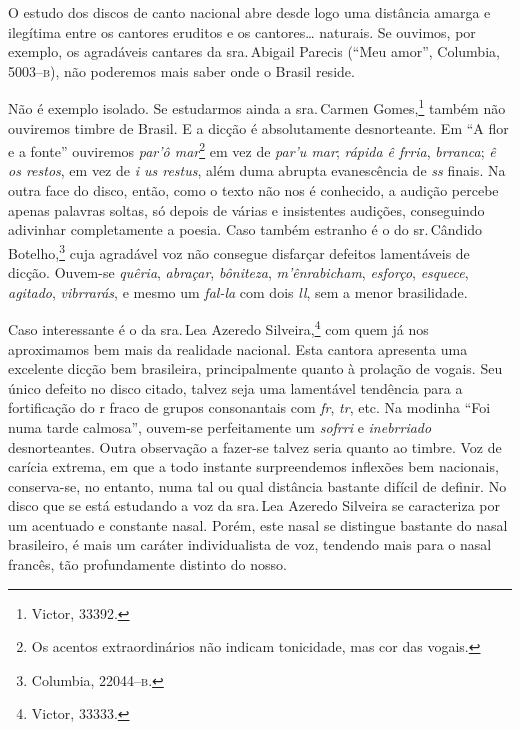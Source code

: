O estudo dos discos de canto nacional abre desde logo uma distância
amarga e ilegítima entre os cantores eruditos e os cantores\ldots{} naturais.
Se ouvimos, por exemplo, os agradáveis cantares da sra.\,Abigail Parecis
(``Meu amor'', Columbia, 5003--\textsc{b}), não poderemos mais saber onde o Brasil
reside.

Não é exemplo isolado. Se estudarmos ainda a sra.\,Carmen Gomes,\footnote{Victor,
33392.} também não ouviremos timbre de Brasil. E a dicção é
absolutamente desnorteante. Em ``A flor e a fonte'' ouviremos \textit{par'ô
mar}\footnote{Os acentos extraordinários não indicam tonicidade, mas cor das vogais.} em vez de \textit{par'u mar}; \textit{rápida ê frria}, \textit{brranca}; \textit{ê
os restos}, em vez de \textit{i us restus}, além duma abrupta evanescência
de \textit{ss} finais. Na outra face do disco, então, como o texto não nos é
conhecido, a audição percebe apenas palavras soltas, só depois de várias
e insistentes audições, conseguindo adivinhar completamente a poesia.
Caso também estranho é o do sr.\,Cândido Botelho,\footnote{Columbia, 22044--\textsc{b}.}
cuja agradável voz não consegue disfarçar defeitos lamentáveis de
dicção. Ouvem-se \textit{quêria}, \textit{abraçar}, \textit{bôniteza},
\textit{m'ênrabicham}, \textit{esforço}, \textit{esquece}, \textit{agitado}, \textit{vibrrarás},
e mesmo um \textit{fal-la} com dois \textit{ll}, sem a menor brasilidade.

Caso interessante é o da sra.\,Lea Azeredo Silveira,\footnote{Victor, 33333.} com
quem já nos aproximamos bem mais da realidade nacional. Esta cantora
apresenta uma excelente dicção bem brasileira, principalmente quanto à
prolação de vogais. Seu único defeito no disco citado, talvez seja uma
lamentável tendência para a fortificação do r fraco de grupos
consonantais com \textit{fr}, \textit{tr}, etc. Na modinha ``Foi numa tarde calmosa'',
ouvem-se perfeitamente um \textit{sofrri} e \textit{inebrriado} desnorteantes.
Outra observação a fazer-se talvez seria quanto ao timbre. Voz de
carícia extrema, em que a todo instante surpreendemos inflexões bem
nacionais, conserva-se, no entanto, numa tal ou qual distância bastante
difícil de definir. No disco que se está estudando a voz da sra.\,Lea
Azeredo Silveira se caracteriza por um acentuado e constante nasal.
Porém, este nasal se distingue bastante do nasal brasileiro, é mais um
caráter individualista de voz, tendendo mais para o nasal francês, tão
profundamente distinto do nosso.

